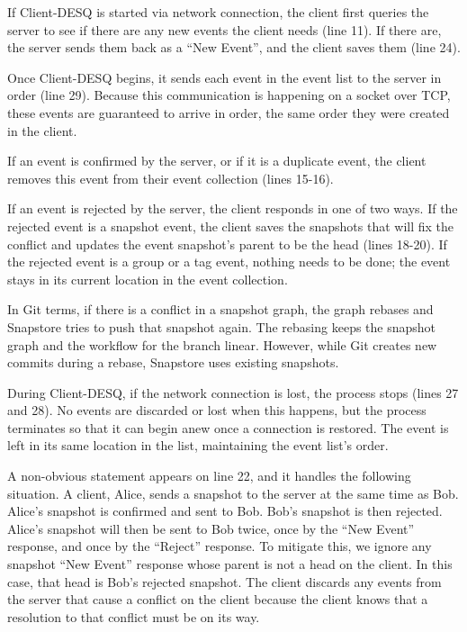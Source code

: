 If Client-DESQ is started via network connection, the client first queries the server to see if there are any new events the client needs (line 11). If there are, the server sends them back as a ``New Event'', and the client saves them (line 24).

Once Client-DESQ begins, it sends each event in the event list to the server in order (line 29). Because this communication is happening on a socket over TCP, these events are guaranteed to arrive in order, the same order they were created in the client.

If an event is confirmed by the server, or if it is a duplicate event, the client removes this event from their event collection (lines 15-16). 

If an event is rejected by the server, the client responds in one of two ways. If the rejected event is a snapshot event, the client saves the snapshots that will fix the conflict and updates the event snapshot's parent to be the head (lines 18-20). If the rejected event is a group or a tag event, nothing needs to be done; the event stays in its current location in the event collection.

In Git terms, if there is a conflict in a snapshot graph, the graph rebases and Snapstore tries to push that snapshot again. The rebasing keeps the snapshot graph and the workflow for the branch linear. However, while Git creates new commits during a rebase, Snapstore uses existing snapshots.

During Client-DESQ, if the network connection is lost, the process stops (lines 27 and 28). No events are discarded or lost when this happens, but the process terminates so that it can begin anew once a connection is restored. The event is left in its same location in the list, maintaining the event list's order.

A non-obvious statement appears on line 22, and it handles the following situation. A client, Alice, sends a snapshot to the server at the same time as Bob. Alice's snapshot is confirmed and sent to Bob. Bob's snapshot is then rejected. Alice's snapshot will then be sent to Bob twice, once by the ``New Event'' response, and once by the ``Reject'' response. To mitigate this, we ignore any snapshot ``New Event'' response whose parent is not a head on the client. In this case, that head is Bob's rejected snapshot. The client discards any events from the server that cause a conflict on the client because the client knows that a resolution to that conflict must be on its way.

